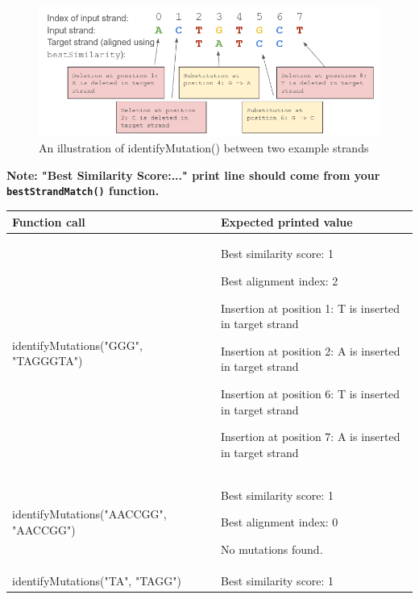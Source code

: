\begin{figure}[htp]
    \centering
    \includegraphics[width=12cm]{images/project1/mutationDetection.png}
    \caption{An illustration of identifyMutation() between two example strands}
    \label{fig:galaxy}
\end{figure}

\begin{sampleProject}

\textbf{Note: "Best Similarity Score:..." print line should come from your \texttt{bestStrandMatch()} function.}
    \hspace{0pt}
    \begin{longtable}{|p{2.6in}|p{2.5in}|}
        \hline
        \textbf{Function call}
            & 
            \textbf{Expected printed value}
            \\ \hline
        
        identifyMutations("GGG", "TAGGGTA")
            & 
            Best similarity score: 1
            
            Best alignment index: 2

            Insertion at position 1: T is inserted in target strand

            Insertion at position 2: A is inserted in target strand

            Insertion at position 6: T is inserted in target strand
            
            Insertion at position 7: A is inserted in target strand
            
            \\ \hline
        
        identifyMutations("AACCGG", "AACCGG")
            & 
            Best similarity score: 1
            
            Best alignment index: 0
            
            No mutations found.
            \\ \hline
        
        identifyMutations("TA", "TAGG")
            & 
            Best similarity score: 1
            

\end{longtable}
\end{sampleProject}
